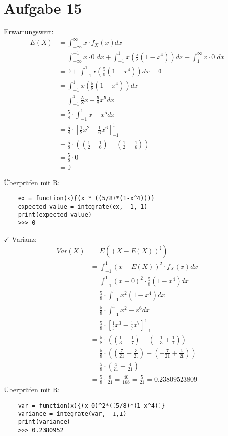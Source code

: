 \documentclass[a4paper]{scrartcl}
\begin{document}
\section*{Aufgabe 15}
Erwartungswert:\\
\begin{align*}
	E(X) & = \int_{-\infty}^{\infty} x \cdot f_X(x) dx\\
	& = \int_{-\infty}^{-1} x\cdot 0\; dx + \int_{-1}^{1} x (\frac{5}{8}(1-x^4))dx + \int_{1}^{\infty}x \cdot 0\;dx\\
	& = 0 + \int_{-1}^{1} x (\frac{5}{8}(1-x^4))dx  + 0\\
	& = \int_{-1}^{1} x(\frac{5}{8}(1-x^4))dx\\
	& = \int_{-1}^{1} \frac{5}{8}x - \frac{5}{8}x^5 dx\\
	& = \frac{5}{8} \cdot \int_{-1}^{1} x - x^5 dx\\
	& = \frac{5}{8} \cdot  \left[ \frac{1}{2}x^2 - \frac{1}{6} x^6\right]_{-1}^1\\
	& = \frac{5}{8} \cdot ((\frac{1}{2} - \frac{1}{6}) - (\frac{1}{2} - \frac{1}{6}))\\
	& = \frac{5}{8} \cdot 0\\
	& = 0
\end{align*}

Überprüfen mit R:\\
\begin{lstlisting}
	ex = function(x){(x * ((5/8)*(1-x^4)))}
	expected_value = integrate(ex, -1, 1)
	print(expected_value)
	>>> 0
\end{lstlisting}

$\checkmark$
\newpage
Varianz:\\
\begin{align*}
	Var(X) & = E((X - E(X))^2)\\
	& = \int_{-1}^{1} (x - E(X))^2 \cdot f_X(x) dx\\
	& = \int_{-1}^{1} (x-0)^2 \cdot \frac{5}{8}(1-x^4) dx\\
	& = \frac{5}{8} \cdot \int_{-1}^{1} x^2(1-x^4) dx\\
	& = \frac{5}{8} \cdot \int_{-1}^{1} x^2 - x^6 dx\\
	& = \frac{5}{8} \cdot \left[\frac{1}{3}x^3 - \frac{1}{7}x^7\right]_{-1}^1\\
	& = \frac{5}{8} \cdot ((\frac{1}{3} - \frac{1}{7}) - (-\frac{1}{3} + \frac{1}{7}))\\
	& = \frac{5}{8} \cdot ((\frac{7}{21} - \frac{3}{21}) - (-\frac{7}{21} + \frac{3}{21}))\\
	& = \frac{5}{8} \cdot (\frac{4}{21} + \frac{4}{21})\\
	& = \frac{5}{8} \cdot \frac{8}{21} = \frac{40}{168} = \frac{5}{21} = 0.23809523809
\end{align*}
Überprüfen mit R:\\
\begin{lstlisting}
	var = function(x){(x-0)^2*((5/8)*(1-x^4))}
	variance = integrate(var, -1,1)
	print(variance)
	>>> 0.2380952
\end{lstlisting}
\end{document}
